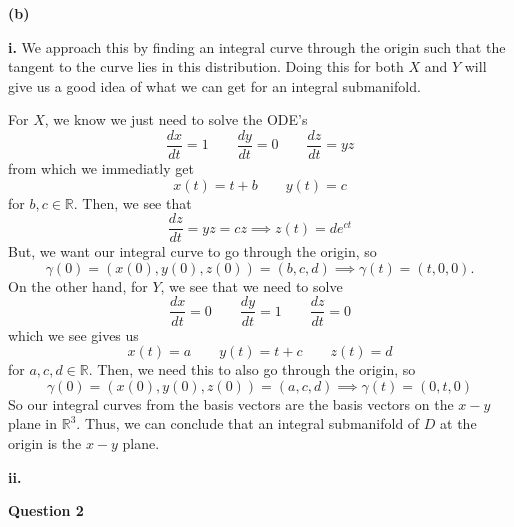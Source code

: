 \documentclass[10pt]{article}
\newcommand{\R}{\mathbb{R}}
\newcommand{\del}[2][]{\frac{d #1}{d #2}}
\begin{document}

\textbf{(b)}

\textbf{i.} We approach this by finding an integral curve through the origin such that the tangent to the curve lies in this distribution. Doing this for both $X$ and $Y$ will give us a good idea of what we can get for an integral submanifold.

For $X$, we know we just need to solve the ODE's
\[ \del[x]{t} = 1 \hspace{2em} \del[y]{t} = 0 \hspace{2em} \del[z]{t} = yz \]
from which we immediatly get
\[ x(t) = t + b \hspace{2em} y(t) = c \]
for $b,c\in\R$. Then, we see that
\[ \del[z]{t} = yz = cz \implies z(t) = de^{ct} \]
But, we want our integral curve to go through the origin, so
\[ \gamma(0) = (x(0),y(0),z(0)) = (b,c,d) \implies \gamma(t) = (t,0,0). \]
On the other hand, for $Y$, we see that we need to solve
\[ \del[x]{t} = 0 \hspace{2em} \del[y]{t} = 1 \hspace{2em} \del[z]{t} = 0 \]
which we see gives us
\[ x(t) = a \hspace{2em} y(t) = t + c \hspace{2em} z(t) = d \]
for $a,c,d\in \R$. Then, we need this to also go through the origin, so
\[ \gamma(0) = (x(0),y(0),z(0)) = (a,c,d) \implies \gamma(t) = (0,t,0) \]
So our integral curves from the basis vectors are the basis vectors on the $x-y$ plane in $\R^{3}$. Thus, we can conclude that an integral submanifold of $D$ at the origin is the $x-y$ plane.

\textbf{ii.}


\newpage
\textbf{Question 2}
\end{document}
